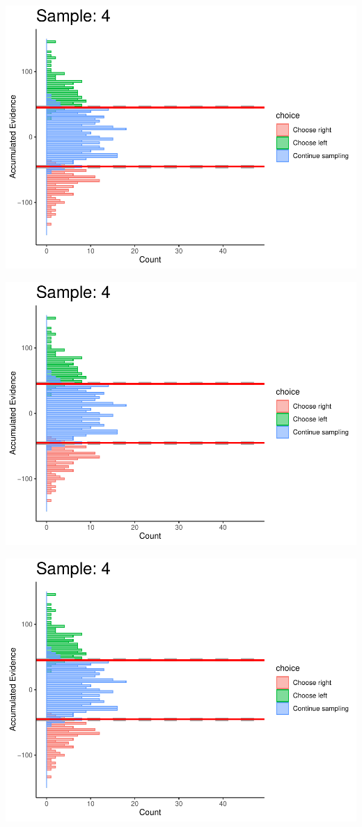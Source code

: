 \documentclass[
]{book}
\begin{document}
\begin{center}\includegraphics[width=0.8\linewidth]{LateNightBayes_files/figure-latex/collapsing_dcb-32} \end{center}

\begin{center}\includegraphics[width=0.8\linewidth]{LateNightBayes_files/figure-latex/collapsing_dcb-33} \end{center}

\begin{center}\includegraphics[width=0.8\linewidth]{LateNightBayes_files/figure-latex/collapsing_dcb-34} \end{center}
\end{document}
